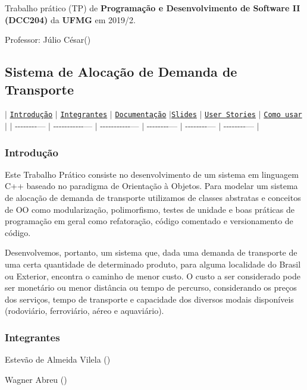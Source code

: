 Trabalho prático (TP) de {\bfseries Programação e Desenvolvimento de Software II (D\+C\+C204)} da {\bfseries U\+F\+MG} em 2019/2.

Professor\+: Júlio César()

\subsection*{Sistema de Alocação de Demanda de Transporte}

$\vert$ \href{#introdução}{\tt Introdução} $\vert$ \href{#integrantes}{\tt Integrantes} $\vert$ \href{#documentação}{\tt Documentação} $\vert$\href{#slides}{\tt Slides} $\vert$ \href{#user-stories}{\tt User Stories} $\vert$ \href{#como-usar}{\tt Como usar} $\vert$ $\vert$ -\/-\/-\/-\/-\/-\/-\/-\/--- $\vert$ -\/-\/-\/-\/-\/-\/-\/-\/-\/-\/-\/--- $\vert$ -\/-\/-\/-\/-\/-\/-\/-\/-\/-\/-\/--- $\vert$ -\/-\/-\/-\/-\/-\/-\/-\/--- $\vert$ -\/-\/-\/-\/-\/-\/-\/-\/--- $\vert$ -\/-\/-\/-\/-\/-\/-\/-\/--- $\vert$ 



\subsubsection*{Introdução}

Este Trabalho Prático consiste no desenvolvimento de um sistema em linguagem C++ baseado no paradigma de Orientação à Objetos. Para modelar um sistema de alocação de demanda de transporte utilizamos de classes abstratas e conceitos de OO como modularização, polimorfismo, testes de unidade e boas práticas de programação em geral como refatoração, código comentado e versionamento de código.

Desenvolvemos, portanto, um sistema que, dada uma demanda de transporte de uma certa quantidade de determinado produto, para alguma localidade do Brasil ou Exterior, encontra o caminho de menor custo. O custo a ser considerado pode ser monetário ou menor distância ou tempo de percurso, considerando os preços dos serviços, tempo de transporte e capacidade dos diversos modais disponíveis (rodoviário, ferroviário, aéreo e aquaviário).

\subsubsection*{Integrantes}


\begin{DoxyItemize}
\item Estevão de Almeida Vilela ()
\item Wagner Abreu ()
\end{DoxyItemize}


